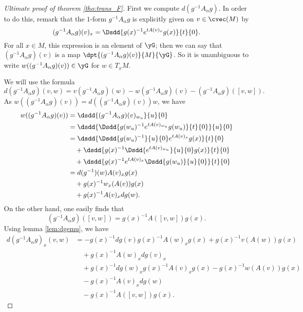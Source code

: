 \begin{proof}[Ultimate proof of theorem \ref{tho:trans_F}]\label{preuve_trans_F}
First we compute $d(g^{-1} A_{\alpha} g)$. In order to do this, remark that the $1$-form $g^{-1} A_{\alpha} g$ is explicitly given on $v\in\cvec(M)$ by
\[
   (g^{-1} A_{\alpha} g)(v)_x=\Dsdd{g(x)^{-1} e^{tA(v)_x}g(x)}{t}{0}.
\]
For all $x\in M$, this expression is an element of $\yG$; then we can say that $(g^{-1} A_{\alpha} g)(v)$ is a map $\dpt{(g^{-1} A_{\alpha} g)(v)}{M}{\yG}$. So it is unambiguous to write $w((g^{-1} A_{\alpha} g)(v))\in\yG$ for $w\in T_xM$.

We will use the formula
\[
   d(g^{-1} A_{\alpha} g)(v,w)=v(g^{-1} A_{\alpha} g)(w)-w(g^{-1} A_{\alpha} g)(v)-(g^{-1} A_{\alpha} g)([v,w]).
\]
As $w((g^{-1} A_{\alpha} g)(v))=d((g^{-1} A_{\alpha} g)(v))w$, we have
\begin{equation}
\begin{split}
    w((g^{-1} A_{\alpha} g)(v))&=\dsdd{(g^{-1} A_{\alpha} g)(v)_{w_u}}{u}{0}\\
                &=\dsdd{ \Dsdd{g(w_u)^{-1} e^{tA(v)_{w_u}}g(w_u)}{t}{0}  }{u}{0}\\
		&=\dsdd{  \Dsdd{g(w_u)^{-1}}{u}{0} e^{tA(v)_x}g(x)  }{t}{0}\\
		&\quad+\dsdd{ g(x)^{-1} \Dsdd{e^{tA(v)_{w_u}}}{u}{0} g(x)  }{t}{0}\\
		&\quad+\dsdd{  g(x)^{-1} e^{tA(v)_x} \Dsdd{g(w_u)}{u}{0}  }{t}{0}\\
		&=d(g^{-1})(w)A(v)_xg(x)\\
		&\quad+g(x)^{-1} w_x(A(v))g(x)\\
		&\quad+g(x)^{-1} A(v)_x dg(w).
\end{split}
\end{equation}
On the other hand, one easily finds that
\[
     (g^{-1} A_{\alpha} g)([v,w])=g(x)^{-1} A([v,w])g(x).
\]
 Using lemma \ref{lem:dgemu}, we have
\begin{equation}
\begin{split}
   d(g^{-1} A_{\alpha} g)_x(v,w)&=-g(x)^{-1} dg(v)g(x)^{-1} A(w)_xg(x)+g(x)^{-1} v(A(w))g(x)\\&\quad+g(x)^{-1} A(w)_xdg(v)_x\\
                   &\quad+g(x)^{-1} dg(w)_xg(x)^{-1} A(v)_xg(x)-g(x)^{-1} w(A(v))g(x)\\&\quad-g(x)^{-1} A(v)_xdg(w)\\
		   &\quad-g(x)^{-1} A([v,w])g(x).
\end{split}
\end{equation}

\end{proof}
